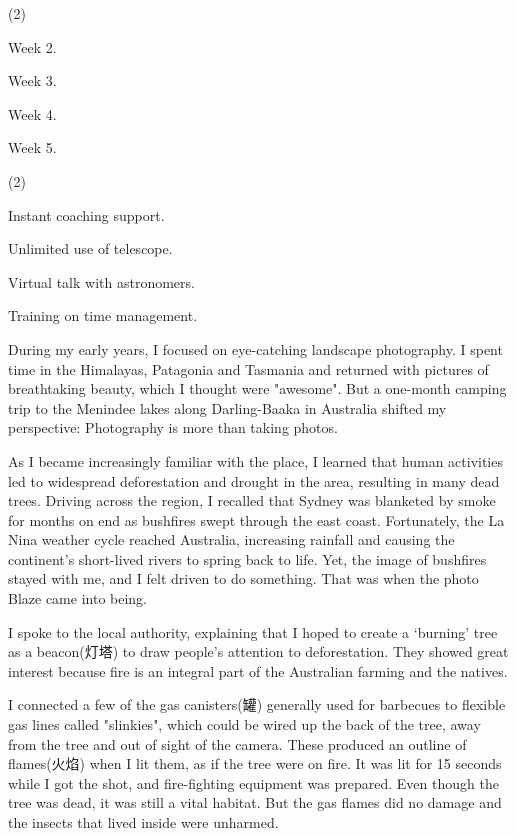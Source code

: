 \documentclass{英语试卷}
\begin{document}
\begin{choices}(2)
  \item Week 2.
  \item Week 3.
  \item Week 4.
  \item Week 5.
\end{choices}
\begin{choices}(2)
  \item Instant coaching support.
  \item Unlimited use of telescope.
  \item Virtual talk with astronomers.
  \item Training on time management.
\end{choices}
\par During my early years, I focused on eye-catching landscape photography. I spent time in the Himalayas, Patagonia and Tasmania and returned with pictures of breathtaking beauty, which I thought were "awesome". But a one-month camping trip to the Menindee lakes along Darling-Baaka in Australia shifted my perspective: Photography is more than taking photos.\par
\par As I became increasingly familiar with the place, I learned that human activities led to widespread deforestation and drought in the area, resulting in many dead trees. Driving across the region, I recalled that Sydney was blanketed by smoke for months on end as bushfires swept through the east coast. Fortunately, the La Nina weather cycle reached Australia, increasing rainfall and causing the continent's short-lived rivers to spring back to life. Yet, the image of bushfires stayed with me, and I felt driven to do something. That was when the photo Blaze came into being.\par
\par I spoke to the local authority, explaining that I hoped to create a ‘burning’ tree as a beacon(灯塔) to draw people's attention to deforestation. They showed great interest because fire is an integral part of the Australian farming and the natives.\par
\par I connected a few of the gas canisters(罐) generally used for barbecues to flexible gas lines called "slinkies", which could be wired up the back of the tree, away from the tree and out of sight of the camera. These produced an outline of flames(火焰) when I lit them, as if the tree were on fire. It was lit for 15 seconds while I got the shot, and fire-fighting equipment was prepared. Even though the tree was dead, it was still a vital habitat. But the gas flames did no damage and the insects that lived inside were unharmed.\par
\end{document}
